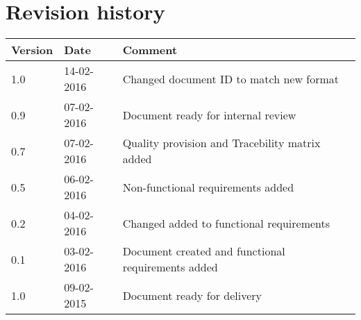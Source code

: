 \label{chp_revisionHistory}
\chapter{Revision history}

\begin{longtable}{| p{1.5cm}  | p{3cm} |  p{8cm} | }
	\hline
	\textbf{Version} & \textbf{Date} & \textbf{Comment} \\
    \hline
    1.0 & 14-02-2016 & Changed document ID to match new format \\
    \hline
    0.9 & 07-02-2016 & Document ready for internal review \\
	\hline
    0.7 & 07-02-2016 & Quality provision and Tracebility matrix added \\
    \hline
   	0.5 & 06-02-2016 & Non-functional requirements added \\
    \hline
	0.2 & 04-02-2016 & Changed added to functional requirements \\
	\hline
    0.1 & 03-02-2016 & Document created and functional requirements added  \\
	\hline
	1.0 & 09-02-2015 & Document ready for delivery \\
	\hline
\end{longtable}

